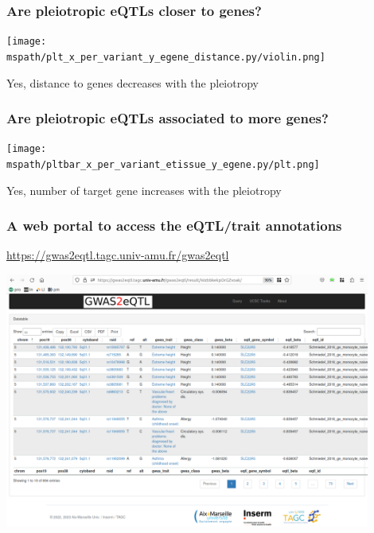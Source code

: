 \documentclass{beamer}
\newcommand*{\mspath}{../../out/gwas417/pval_5e-08/r2_0.1/kb_1000/window_1000000/75_50}%
\newcounter{frame}[frame]
\begin{document}
    \begin{frame}
        \frametitle{Are pleiotropic eQTLs closer to genes?}

        \begin{center}
            \texttt{[image: \\mspath/plt\_x\_per\_variant\_y\_egene\_distance.py/violin.png]}
        \end{center}
        \vfill
        Yes, distance to genes decreases with the pleiotropy

    \end{frame}

    \begin{frame}
        \frametitle{Are pleiotropic eQTLs associated to more genes?}

        \begin{center}
            \texttt{[image: \\mspath/pltbar\_x\_per\_variant\_etissue\_y\_egene.py/plt.png]}
        \end{center}
        \vfill
        Yes, number of target gene increases with the pleiotropy

    \end{frame}

    \begin{frame}
        \frametitle{A web portal to access the eQTL/trait annotations}

        \url{https://gwas2eqtl.tagc.univ-amu.fr/gwas2eqtl}

        \begin{center}
            \includegraphics[width=0.9\textwidth]{fig/gwas2eqtl.png}
        \end{center}

    \end{frame}
\end{document}
